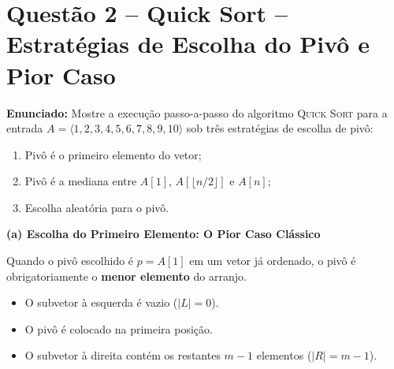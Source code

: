 \documentclass[11pt,a4paper]{article}
\newcommand{\topico}[1]{\par\medskip\textbf{\color{azul}#1}\par}
\newcommand{\questao}[2]{\section*{Questão #1 -- #2}}
\begin{document}
\newpage
\questao{2}{Quick Sort -- Estratégias de Escolha do Pivô e Pior Caso}

\textbf{Enunciado:} Mostre a execução passo-a-passo do algoritmo \textsc{Quick Sort} para a entrada $A = \langle 1, 2, 3, 4, 5, 6, 7, 8, 9, 10 \rangle$ sob três estratégias de escolha de pivô:
\begin{enumerate}
  \item[(a)] Pivô é o primeiro elemento do vetor;
  \item[(b)] Pivô é a mediana entre $A[1]$, $A[\lfloor n/2 \rfloor]$ e $A[n]$;
  \item[(c)] Escolha aleatória para o pivô.
\end{enumerate}

\topico{(a) Escolha do Primeiro Elemento: O Pior Caso Clássico}
Quando o pivô escolhido é $p = A[1]$ em um vetor já ordenado, o pivô é obrigatoriamente o \textbf{menor elemento} do arranjo.
\begin{itemize}
  \item O subvetor à esquerda é vazio ($|L| = 0$).
  \item O pivô é colocado na primeira posição.
  \item O subvetor à direita contém os restantes $m - 1$ elementos ($|R| = m - 1$).
\end{itemize}
\end{document}
